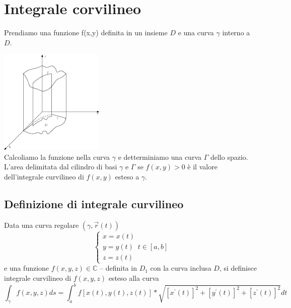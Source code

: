 \section{Integrale corvilineo}
Prendiamo una funzione f(x,y) definita in un insieme $D$ e una curva $\gamma$
interno a $D$.
\begin{multicols}{2}
	\includegraphics[width=5cm]{img/finiti/integrale_curvilineo.eps}\\
	Calcoliamo la funzione nella curva $\gamma$ e detterminiamo una curva
	$\Gamma$ dello spazio.\\
	L'area delimitata dal cilindro di basi $\gamma$ e $\Gamma$ se $f(x,y)>0$ è
	il valore {\color{red}dell'integrale curvilineo} di $f(x,y)$ esteso a
	$\gamma$.
\end{multicols}
\subsection{Definizione di integrale curvilineo}
Data una curva regolare $(\gamma, \vec{r}(t))$
\begin{equation}
	\begin{cases}
		x=x(t)\\
		y=y(t)\\
		z=z(t)
	\end{cases} t\in [a,b]
\end{equation} 
e una funzione $f(x,y,z)\in \mathds{C}$ -- definita in $D_1$ con la curva
inclusa $D$, si definisce {\color{red}integrale curvilineo} di $f(x,y,z)$
esteso alla curva
\begin{equation*}
	\int_{\gamma} f(x,y,z) ds=
	\int_{a}^{b}f[x(t),y(t),z(t)]*\sqrt{[x^\prime(t)]^2+[y^\prime(t)]^2+[z^\prime(t)]^2}
	dt
\end{equation*}
